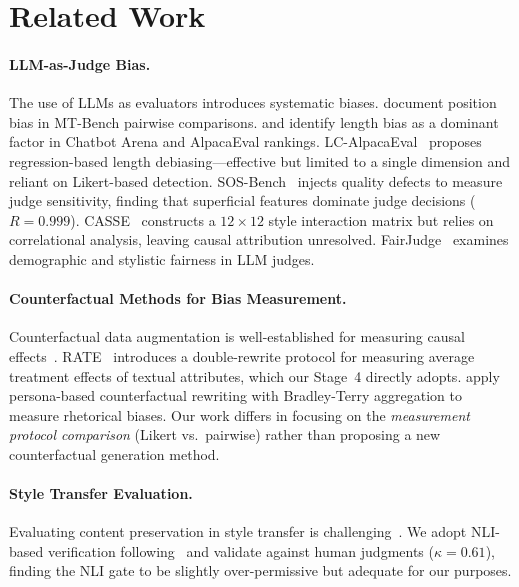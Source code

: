\documentclass[11pt,a4paper]{article}
\begin{document}
\section{Related Work}

\paragraph{LLM-as-Judge Bias.}
The use of LLMs as evaluators introduces systematic biases.
\citet{zheng2023judging} document position bias in MT-Bench pairwise comparisons.
\citet{wang2023large} and \citet{park2024disentangling} identify length bias as a dominant factor in Chatbot Arena and AlpacaEval rankings.
LC-AlpacaEval~\citep{dubois2024length} proposes regression-based length debiasing---effective but limited to a single dimension and reliant on Likert-based detection.
SOS-Bench~\citep{sosbench2025} injects quality defects to measure judge sensitivity, finding that superficial features dominate judge decisions ($R=0.999$).
CASSE~\citep{casse2026} constructs a $12 \times 12$ style interaction matrix but relies on correlational analysis, leaving causal attribution unresolved.
FairJudge~\citep{lin2025fairjudge} examines demographic and stylistic fairness in LLM judges.

\paragraph{Counterfactual Methods for Bias Measurement.}
Counterfactual data augmentation is well-established for measuring causal effects~\citep{veitch2020counterfactual,kaushik2020learning}.
RATE~\citep{feuer2025rate} introduces a double-rewrite protocol for measuring average treatment effects of textual attributes, which our Stage~4 directly adopts.
\citet{counterfactual_rhetorical2025} apply persona-based counterfactual rewriting with Bradley-Terry aggregation to measure rhetorical biases.
Our work differs in focusing on the \emph{measurement protocol comparison} (Likert vs.\ pairwise) rather than proposing a new counterfactual generation method.

\paragraph{Style Transfer Evaluation.}
Evaluating content preservation in style transfer is challenging~\citep{mir2019evaluating,krishna2020reformulating}.
We adopt NLI-based verification following~\citet{luo2019dual} and validate against human judgments ($\kappa=0.61$), finding the NLI gate to be slightly over-permissive but adequate for our purposes.
\end{document}
